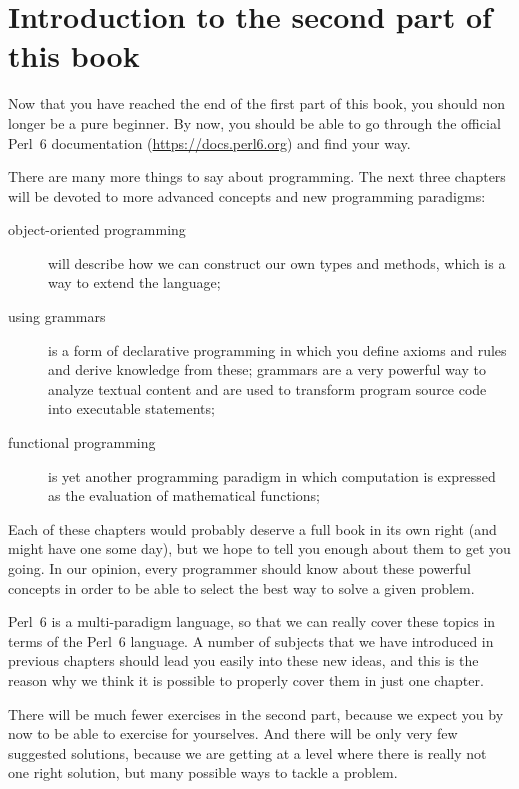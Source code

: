 
\chapter{Introduction to the second part of this book}

Now that you have reached the end of the first part 
of this book, you should non longer be a pure beginner. 
By now, you should be able to go through the official 
Perl~6 documentation (\url{https://docs.perl6.org}) 
and find your way. 

There are many more things to say about programming. 
The next three chapters will be devoted to more 
advanced concepts and new programming paradigms:
\begin{description}

\item[object-oriented programming] will describe how 
we can construct our own types and methods, which 
is a way to extend the language;

\item[using grammars] is a form of declarative 
programming in which you define axioms and rules 
and derive knowledge from these; grammars are a 
very powerful way to analyze textual content and 
are used to transform program source code into 
executable statements;

\item[functional programming] is yet another programming 
paradigm in which computation is expressed as the 
evaluation of mathematical functions; 
\end{description}

Each of these chapters would probably deserve a full 
book in its own right (and might have one some day), 
but we hope to tell you enough about them to get you 
going. In our opinion, every programmer should know 
about these powerful concepts in order to be able 
to select the best way to solve a given problem.

Perl~6 is a multi-paradigm language, so that we can 
really cover these topics in terms of the Perl~6 
language. A number of subjects that we have 
introduced in previous chapters should lead you 
easily into these new ideas, and this is the 
reason why we think it is possible to properly cover 
them in just one chapter.

There will be much fewer exercises in the second part, 
because we expect you by now to be able to exercise for 
yourselves. And there will be only very few suggested solutions, 
because we are getting at a level where there is really not  
one right solution, but many possible ways to tackle 
a problem.

